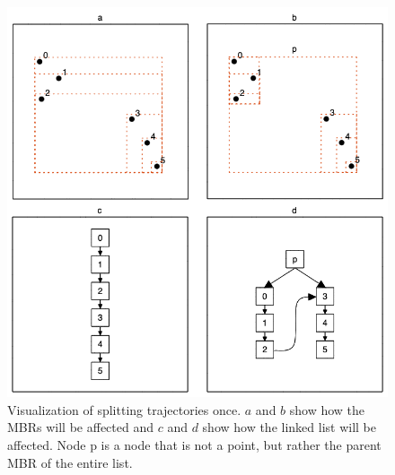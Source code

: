 \begin{figure}
	\centering
	\includegraphics[width=\textwidth]{figures/Trajectory_splitting.excalidraw.png}
	\caption{Visualization of splitting trajectories once. $a$ and $b$ show how the MBRs will be affected and $c$ and $d$ show how the linked list will be affected. Node p is a node that is not a point, but rather the parent MBR of the entire list.}
	\label{fig:trajectory_splitting}
\end{figure}


